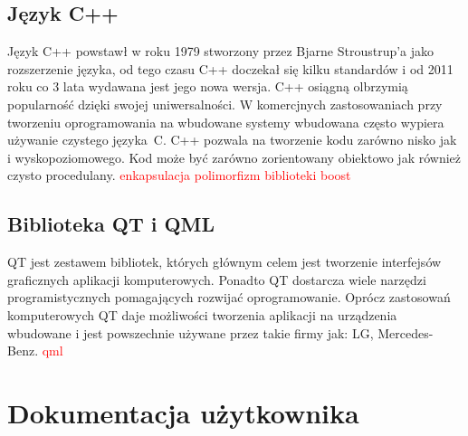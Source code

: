 \documentclass[12pt, eng, twoside, openany, final]{mgr}
\begin{document}
    \section{Język C++}
    Język C++ powstawł w roku 1979 stworzony przez Bjarne Stroustrup'a jako rozszerzenie języka, od tego czasu C++ doczekał się kilku standardów i od 2011 roku co 3 lata wydawana jest jego nowa wersja. C++ osiągną olbrzymią popularność dzięki swojej uniwersalności. W komercjnych zastosowaniach przy tworzeniu oprogramowania na wbudowane systemy wbudowana często wypiera używanie czystego języka~C. C++ pozwala na tworzenie kodu zarówno nisko jak i wyskopoziomowego. Kod może być zarówno zorientowany obiektowo jak również czysto procedulany. 
     \textcolor{red}{enkapsulacja
    polimorfizm
    biblioteki
    boost}
    
    
    \newpage
    \section{Biblioteka QT i QML}
    QT jest zestawem bibliotek, których głównym celem jest tworzenie interfejsów graficznych aplikacji komputerowych. Ponadto QT dostarcza wiele narzędzi programistycznych pomagających rozwijać oprogramowanie. Oprócz zastosowań komputerowych QT daje możliwości tworzenia aplikacji na urządzenia wbudowane i jest powszechnie używane przez takie firmy jak: LG, Mercedes-Benz.
    \textcolor{red}{qml }
 
%
\chapter{Dokumentacja użytkownika}
\thispagestyle{fancy}
\end{document}
